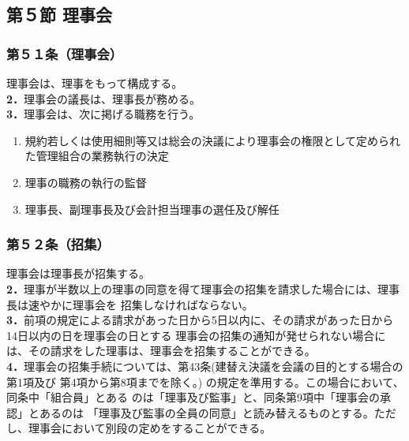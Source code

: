 \documentclass[
  luatex,
  paper=a4paper,
  fontsize=11pt,
  jafontsize=11pt,
  jlreq_notes,
]{jlreq}
\begin{document}
  \begin{center}
  \subsection*{第５節 理事会}
  \end{center}
  \subsubsection*{第５１条（理事会）}
  理事会は、理事をもって構成する。\\
  \textbf{2．}理事会の議長は、理事長が務める。\\
  \textbf{3．}理事会は、次に掲げる職務を行う。
  \begin{enumerate}
    \item 規約若しくは使用細則等又は総会の決議により理事会の権限として定められた管理組合の業務執行の決定
    \item 理事の職務の執行の監督
    \item 理事長、副理事長及び会計担当理事の選任及び解任
  \end{enumerate}
  \subsubsection*{第５２条（招集）}
  理事会は理事長が招集する。\\
  \textbf{2．}理事が半数以上の理事の同意を得て理事会の招集を請求した場合には、理事長は速やかに理事会を
  招集しなければならない。\\
  \textbf{3．}前項の規定による請求があった日から5日以内に、その請求があった日から14日以内の日を理事会の日とする
  理事会の招集の通知が発せられない場合には、その請求をした理事は、理事会を招集することができる。\\
  \textbf{4．}理事会の招集手続については、第43条(建替え決議を会議の目的とする場合の第1項及び 第4項から第8項までを除く。)
  の規定を準用する。この場合において、同条中「組合員」とある のは「理事及び監事」と、同条第9項中「理事会の承認」とあるのは
  「理事及び監事の全員の同意」と読み替えるものとする。ただし、理事会において別段の定めをすることができる。
\end{document}
